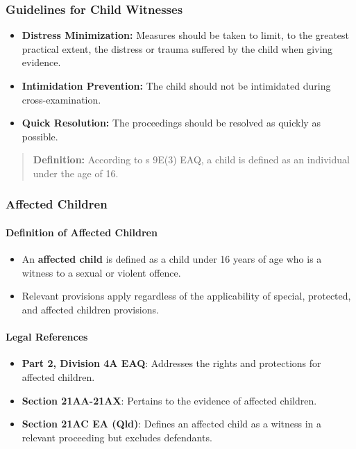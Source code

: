 \subsubsection{Guidelines for Child
Witnesses}\label{guidelines-for-child-witnesses}

\begin{itemize}
\tightlist
\item
  \textbf{Distress Minimization:} Measures should be taken to limit, to
  the greatest practical extent, the distress or trauma suffered by the
  child when giving evidence.
\item
  \textbf{Intimidation Prevention:} The child should not be intimidated
  during cross-examination.
\item
  \textbf{Quick Resolution:} The proceedings should be resolved as
  quickly as possible.
\end{itemize}

\begin{quote}
\textbf{Definition:} According to s 9E(3) EAQ, a child is defined as an
individual under the age of 16.
\end{quote}

\subsubsection{Affected Children}\label{affected-children}

\paragraph{Definition of Affected
Children}\label{definition-of-affected-children}

\begin{itemize}
\tightlist
\item
  An \textbf{affected child} is defined as a child under 16 years of age
  who is a witness to a sexual or violent offence.
\item
  Relevant provisions apply regardless of the applicability of special,
  protected, and affected children provisions.
\end{itemize}

\paragraph{Legal References}\label{legal-references}

\begin{itemize}
\tightlist
\item
  \textbf{Part 2, Division 4A EAQ}: Addresses the rights and protections
  for affected children.
\item
  \textbf{Section 21AA-21AX}: Pertains to the evidence of affected
  children.
\item
  \textbf{Section 21AC EA (Qld)}: Defines an affected child as a witness
  in a relevant proceeding but excludes defendants.
\end{itemize}

